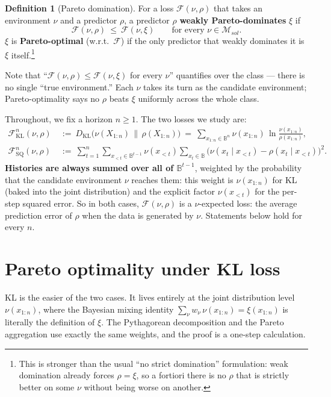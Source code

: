 \documentclass[fontsize=11pt, parskip=half]{scrartcl}
\theoremstyle{definition}
\newtheorem{definition}[theorem]{Definition}
\newcommand{\Msol}{\mathcal{M}_{sol}}
\newcommand{\KL}{D_{\text{KL}}}
\newcommand{\FSQ}{\mathcal{F}_{\text{SQ}}}
\newcommand{\FKL}{\mathcal{F}_{\text{KL}}}
\begin{document}
\begin{definition}[Pareto domination]\label{def:pareto}
For a loss $\mathcal F(\nu, \rho)$ that takes an environment $\nu$ and a
predictor $\rho$, a predictor $\rho$ \textbf{weakly Pareto-dominates} $\xi$ if
\[
  \mathcal F(\nu, \rho) ~\leq~ \mathcal F(\nu, \xi)
  \qquad \text{for every } \nu \in \Msol.
\]
$\xi$ is \textbf{Pareto-optimal} (w.r.t.\ $\mathcal F$) if the only predictor
that weakly dominates it is $\xi$ itself.\footnote{This is stronger than the
usual ``no strict domination'' formulation: weak domination already forces
$\rho = \xi$, so a fortiori there is no $\rho$ that is strictly better on some
$\nu$ without being worse on another.}

Note that ``$\mathcal F(\nu, \rho) \leq \mathcal F(\nu, \xi)$ for every $\nu$''
quantifies over the class --- there is no single ``true environment.'' Each
$\nu$ takes its turn as the candidate environment; Pareto-optimality says no
$\rho$ beats $\xi$ uniformly across the whole class.

\medskip
Throughout, we fix a horizon $n \geq 1$. The two losses we study are:
\begin{align*}
  \FKL^n(\nu, \rho)
    ~&:=~
    \KL\bigl(\nu(X_{1:n}) \,\big\|\, \rho(X_{1:n})\bigr)
    ~=~
    \sum_{x_{1:n} \in \mathbb{B}^n}
      \nu(x_{1:n}) \, \ln \frac{\nu(x_{1:n})}{\rho(x_{1:n})}, \\[4pt]
  \FSQ^n(\nu, \rho)
    ~&:=~
    \sum_{t=1}^{n}
    \sum_{x_{<t} \in \mathbb{B}^{t-1}}
      \nu(x_{<t})
    \sum_{x_t \in \mathbb{B}}
      \bigl(\nu(x_t \mid x_{<t}) - \rho(x_t \mid x_{<t})\bigr)^{2}.
\end{align*}
\textbf{Histories are always summed over all of $\mathbb{B}^{t-1}$}, weighted
by the probability that the candidate environment $\nu$ reaches them: this
weight is $\nu(x_{1:n})$ for KL (baked into the joint distribution) and the
explicit factor $\nu(x_{<t})$ for the per-step squared error. So in both
cases, $\mathcal F(\nu, \rho)$ is a $\nu$-expected loss: the average prediction
error of $\rho$ when the data is generated by $\nu$. Statements below hold for
every $n$.
\end{definition}

\section{Pareto optimality under KL loss}\label{prob:kl}

KL is the easier of the two cases. It lives entirely at the joint distribution
level $\nu(x_{1:n})$, where the Bayesian mixing identity $\sum_\nu w_\nu \,
\nu(x_{1:n}) = \xi(x_{1:n})$ is literally the definition of $\xi$. The
Pythagorean decomposition and the Pareto aggregation use exactly the same
weights, and the proof is a one-step calculation.
\end{document}
